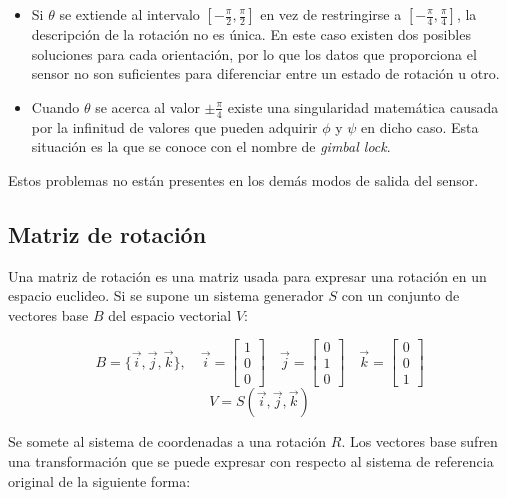 \documentclass[12pt, a4paper]{report}
\begin{document}
\begin{itemize}

\item Si $\theta$ se extiende al intervalo $[-\frac{\pi}{2}, \frac{\pi}{2}]$ en vez de restringirse a $[-\frac{\pi}{4}, \frac{\pi}{4}]$, la descripción de la rotación no es única. En este caso existen dos posibles soluciones para cada orientación, por lo que los datos que proporciona el sensor no son suficientes para diferenciar entre un estado de rotación u otro.

\item Cuando $\theta$ se acerca al valor $\pm\frac{\pi}{4}$ existe una singularidad matemática causada por la infinitud de valores que pueden adquirir $\phi$ y $\psi$ en dicho caso. Esta situación es la que se conoce con el nombre de \textit{gimbal lock}.

\end{itemize}

Estos problemas no están presentes en los demás modos de salida del sensor.

\subsection{Matriz de rotación}

Una matriz de rotación es una matriz usada para expresar una rotación en un espacio euclideo. Si se supone un sistema generador $S$ con un conjunto de vectores base $B$ del espacio vectorial $V$:

$$ B = \{\vec{i}, \vec{j}, \vec{k}\}, \quad \vec{i} = \begin{bmatrix} 1\\0\\0 \end{bmatrix} \quad  \vec{j} = \begin{bmatrix} 0\\1\\0 \end{bmatrix} \quad  \vec{k} = \begin{bmatrix} 0\\0\\1 \end{bmatrix} $$
$$ V = S(\vec{i}, \vec{j}, \vec{k}) $$

Se somete al sistema de coordenadas a una rotación $R$. Los vectores base sufren una transformación que se puede expresar con respecto al sistema de referencia original de la siguiente forma:
\end{document}

